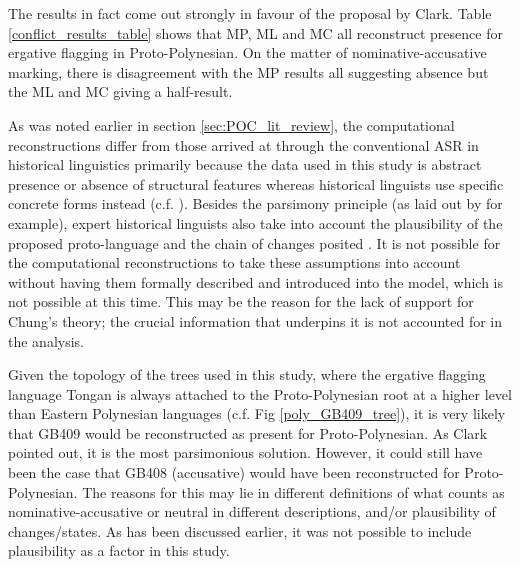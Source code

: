 \documentclass[12pt,letterpaper]{article}
\begin{document}


The results in fact come out strongly in favour of the proposal by Clark. Table \ref{conflict_results_table} shows that MP, ML and MC all reconstruct presence for ergative flagging in Proto-Polynesian. On the matter of nominative-accusative marking, there is disagreement with the MP results all suggesting absence but the ML and MC giving a half-result.




As was noted earlier in section \ref{sec:POC_lit_review}, the computational reconstructions differ from those arrived at through the conventional ASR in historical linguistics primarily because the data used in this study is abstract presence or absence of structural features whereas historical linguists use specific concrete forms instead (c.f. \citet{crowley1985common}). Besides the parsimony principle (as laid out by \citet[19]{clark1973aspects} for example), expert historical linguists also take into account the plausibility of the proposed proto-language and the chain of changes posited \citep{chung1977aspects}. It is not possible for the computational reconstructions to take these assumptions into account without having them formally described and introduced into the model, which is not possible at this time. This may be the reason for the lack of support for Chung's theory; the crucial information that underpins it is not accounted for in the analysis.

Given the topology of the trees used in this study, where the ergative flagging language Tongan is always attached to the Proto-Polynesian root at a higher level than Eastern Polynesian languages (c.f. Fig \ref{poly_GB409_tree}), it is very likely that GB409 would be reconstructed as present for Proto-Polynesian. As Clark pointed out, it is the most parsimonious solution. However, it could still have been the case that GB408 (accusative) would have been reconstructed for Proto-Polynesian. The reasons for this may lie in different definitions of what counts as nominative-accusative or neutral in different descriptions, and/or plausibility of changes/states. As has been discussed earlier, it was not possible to include plausibility as a factor in this study.
\end{document}

